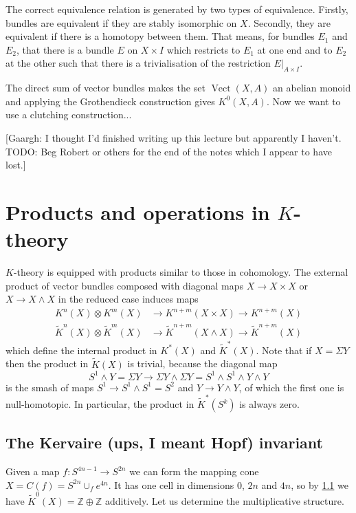 \documentclass[a4paper,10pt]{article}
\theoremstyle{plain}%
\theoremstyle{definition}
\theoremstyle{remark}
\newcommand{\ZZ}{\mathbb{Z}}
\newcommand{\KR}{\widetilde{K}}   %
\newcommand{\smsh}{\wedge}  %
\newcommand{\susp}{\Sigma}  %
\DeclareMathOperator{\Vect}{Vect}
\begin{document}
The correct equivalence relation is generated by two types of
equivalence. Firstly, bundles are equivalent if they are stably
isomorphic on $X$. Secondly, they are equivalent if there is a
homotopy between them. That means, for bundles $E_1$ and $E_2$, that
there is a bundle $E$ on $X\times I$ which restricts to $E_1$ at one
end and to $E_2$ at the other such that there is a trivialisation of
the restriction $E|_{A\times I}$.

The direct sum of vector bundles makes the set $\Vect(X,A)$ an abelian
monoid and applying the Grothendieck construction gives
$K^0(X,A)$. Now we want to use a clutching construction...

[Gaargh: I thought I'd finished writing up this lecture but apparently
I haven't. TODO: Beg Robert or others for the end of the notes which I
appear to have lost.]

\section{Products and operations in $K$-theory}

$K$-theory is equipped with products similar to those in cohomology. The external product of vector bundles composed with diagonal maps $X\to X\times X$ or $X\to X\smsh X$ in the reduced case induces maps
\begin{align*}
K^n(X)\otimes K^m(X)&\to K^{n+m}(X\times X)\to K^{n+m}(X)\\
\KR^n(X)\otimes \KR^m(X)&\to \KR^{n+m}(X\smsh X)\to \KR^{n+m}(X)
\end{align*}
which define the internal product in $K^*(X)$ and $\KR^*(X)$. Note that if $X=\susp Y$ then the product in $\KR(X)$ is trivial, because the diagonal map
$$S^1\smsh Y=\susp Y\to \susp Y\smsh \susp Y=S^1\smsh S^1\smsh Y\smsh Y$$
is the smash of maps $S^1\to S^1\smsh S^1=S^2$ and $Y\to Y\smsh Y$, of which the first one is null-homotopic. In particular, the product in $\KR^*(S^k)$ is always zero.

\subsection{The Kervaire (ups, I meant Hopf) invariant}
Given a map $f:S^{4n-1}\to S^{2n}$ we can form the mapping cone $X=C(f)=S^{2n}\cup_f e^{4n}$. It has one cell in dimensions $0$, $2n$ and $4n$, so by \ref{}  we have $\KR^0(X)=\ZZ\oplus\ZZ$ additively. Let us determine the multiplicative structure.
\end{document}
